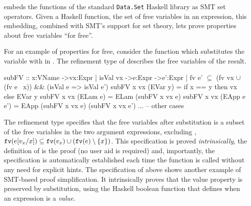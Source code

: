 %
\begin{conference}
  \lh embeds the functions of the standard
  \verb+Data.Set+ Haskell library as SMT
  set operators. Given a Haskell function,
  \eg the set of free variables in an expression,
  this embedding, combined with SMT's
  support for set theory, 
  lets \lh prove
  properties about  free variables
  ``for free''.
\end{conference}
%
For an example of properties for free, consider the function
 which substitutes
the variable  with
 in .
%
The refinement type of  
describes the free variables of the result.
%
\begin{mcode}
  subFV :: x:VName ->vx:{Expr | isVal vx } ->e:Expr
      ->{e':Expr | fv e' $\subseteq$ (fv vx $\cup$ (fv e \ x)) && (isVal e => isVal e')}
  subFV x vx (EVar y)    = if x == y then vx else EVar y
  subFV x vx (ELam   e)  = ELam (subFV x vx e)
  subFV x vx (EApp e e') = EApp (subFV x vx e) (subFV x vx e')
  ... -- other cases
\end{mcode}
%
The refinement type %
specifies
that the free variables after substitution is a subset
of the free variables in the two argument expressions,
excluding , \ie
$\mathtt{fv}(\subst{e}{x}{v_x}) \subseteq
\mathtt{fv}(v_x) \cup (\mathtt{fv}(e) \setminus \{x\})$.
This specification is proved \emph{intrinsically},
\ie the definition of  is the proof
(no user aid is required) and, importantly,
the specification is automatically established each time
the function  is called 
without any need for explicit hints.
%
The specification of  above shows another example
of SMT-based proof simplification. 
It intrinsically proves that the value property is preserved
by substitution, 
using 
the Haskell boolean
function  that defines
when an expression is a \emph{value}. 



